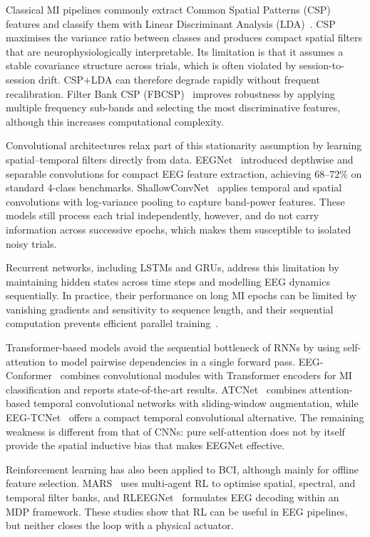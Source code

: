 \documentclass[12pt, a4paper]{article}
\begin{document}
Classical MI pipelines commonly extract Common Spatial Patterns (CSP) features and classify them with Linear Discriminant Analysis (LDA)~\cite{hameed2025enhancing}. CSP maximises the variance ratio between classes and produces compact spatial filters that are neurophysiologically interpretable. Its limitation is that it assumes a stable covariance structure across trials, which is often violated by session-to-session drift. CSP+LDA can therefore degrade rapidly without frequent recalibration. Filter Bank CSP (FBCSP)~\cite{ang2008fbcsp} improves robustness by applying multiple frequency sub-bands and selecting the most discriminative features, although this increases computational complexity.

Convolutional architectures relax part of this stationarity assumption by learning spatial--temporal filters directly from data. EEGNet~\cite{lawhern2018eegnet} introduced depthwise and separable convolutions for compact EEG feature extraction, achieving 68--72\% on standard 4-class benchmarks. ShallowConvNet~\cite{schirrmeister2017deep} applies temporal and spatial convolutions with log-variance pooling to capture band-power features. These models still process each trial independently, however, and do not carry information across successive epochs, which makes them susceptible to isolated noisy trials.

Recurrent networks, including LSTMs and GRUs, address this limitation by maintaining hidden states across time steps and modelling EEG dynamics sequentially. In practice, their performance on long MI epochs can be limited by vanishing gradients and sensitivity to sequence length, and their sequential computation prevents efficient parallel training~\cite{vaswani2017attention}.

Transformer-based models avoid the sequential bottleneck of RNNs by using self-attention to model pairwise dependencies in a single forward pass. EEG-Conformer~\cite{song2022eeg} combines convolutional modules with Transformer encoders for MI classification and reports state-of-the-art results. ATCNet~\cite{altaheri2022atcnet} combines attention-based temporal convolutional networks with sliding-window augmentation, while EEG-TCNet~\cite{ingolfsson2020eeg} offers a compact temporal convolutional alternative. The remaining weakness is different from that of CNNs: pure self-attention does not by itself provide the spatial inductive bias that makes EEGNet effective.

Reinforcement learning has also been applied to BCI, although mainly for offline feature selection. MARS~\cite{shin2024mars} uses multi-agent RL to optimise spatial, spectral, and temporal filter banks, and RLEEGNet~\cite{nallani2024rleegnet} formulates EEG decoding within an MDP framework. These studies show that RL can be useful in EEG pipelines, but neither closes the loop with a physical actuator.
\end{document}
